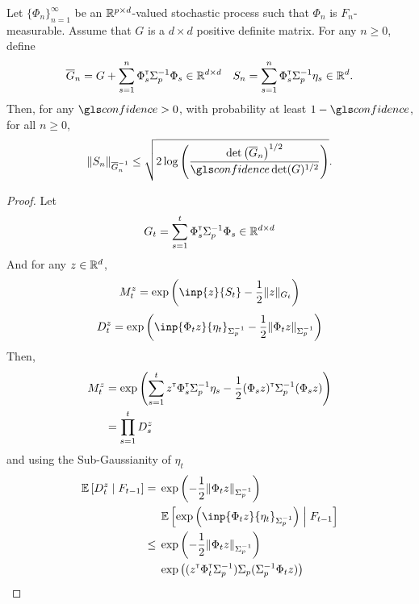 \begin{subappendices}
\begin{proposition}
\begin{leftbar}[propositionbar]
		Let $\{\Phi_n\}_{n=1}^\infty$ be an $\mathbb{R}^{p\times d}$-valued stochastic process such that $\Phi_n$ is $F_n$-measurable. Assume that $G$ is a $d\times d$ positive definite matrix. For any $n\geq 0$, define
		\begin{equation*}
		\overline{G}_n = G + \sum_{s=1}^n \Phi_s^{\mathsf{\scriptscriptstyle T}} \Sigma_p^{-1} \Phi_s \in \mathbb{R}^{d\times d} \quad S_n = \sum_{s=1}^n \Phi_s^{\mathsf{\scriptscriptstyle T}}\Sigma_p^{-1}\eta_s \in \mathbb{R}^{d}.
		\end{equation*}
		Then, for any $\confidence>0$, with probability at least $1-\confidence$, for all $n\geq0$,
		\begin{align*}
		\| S_n \|_{\overline{G}_n^{-1}} \leq \sqrt{2\log \left(\frac{\det\left(\overline{G}_n\right)^{1/2}}{\confidence\det(G)^{1/2}}\right)}.
		\end{align*}
		\end{leftbar}
	\end{proposition}
	\begin{proof}
		Let 
		\begin{equation*}
		G_t = \sum_{s=1}^t \Phi_s^{\mathsf{\scriptscriptstyle T}} \Sigma_p^{-1} \Phi_s \in \mathbb{R}^{d\times d}
		\end{equation*}
		And for any $z\in\mathbb{R}^d$,
		\begin{equation*}
		M_t^z = \exp{\left(\inp{z}{S_t} - \frac{1}{2}\|z\|_{G_t}\right)}
		\end{equation*}
		\begin{equation*}
		D_t^z = \exp{\left(\inp{\Phi_t z}{\eta_t}_{\Sigma_p^{-1}} - \frac{1}{2}\|\Phi_t z\|_{\Sigma_p^{-1}}\right)}
		\end{equation*}
		Then,
		\begin{align*}
		M_t^z &= \exp{\left(\sum_{s=1}^t z^{\mathsf{\scriptscriptstyle T}}\Phi_s^{\mathsf{\scriptscriptstyle T}}\Sigma_p^{-1} \eta_s - \frac{1}{2} (\Phi_s z)^{\mathsf{\scriptscriptstyle T}}\Sigma_p^{-1}(\Phi_s z) \right)} \\
		&= \prod_{s=1}^{t} D_s^z
		\end{align*}
		and using the Sub-Gaussianity of $\eta_t$
		\begin{align*}
		\expectedvalue\left[D_t^z \condbar F_{t-1}\right] = {}& \exp{\left(- \frac{1}{2}\|\Phi_t z\|_{\Sigma_p^{-1}}\right)}\\ &\expectedvalue\left[\exp{\left(\inp{\Phi_t z}{\eta_t}_{\Sigma_p^{-1}}\right)} \condbar F_{t-1}\right]  \\
		\leq {} & \exp{\left(- \frac{1}{2}\|\Phi_t z\|_{\Sigma_p^{-1}}\right)}\\
		&\exp{\left((z^\transp \Phi_t^\transp \Sigma_p^{-1})\Sigma_p(\Sigma_p^{-1} \Phi_t z)\right)}\\

\end{align*}
\end{proof}
\end{subappendices}
